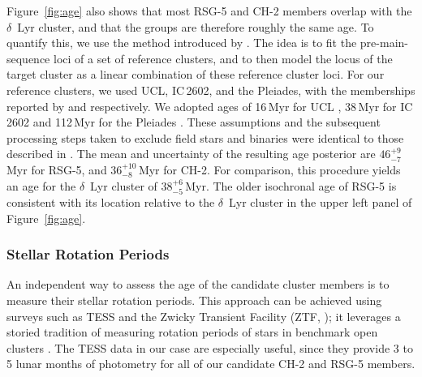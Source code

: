 \documentclass[12pt,twocolumn]{aastex63}
\begin{document}
Figure~\ref{fig:age} also shows that most RSG-5 and CH-2 members
overlap with the $\delta$~Lyr cluster, and that the groups are
therefore roughly the same age.  To quantify this, we use the method
introduced by \citet[][their Section~6.3]{gagne_mutau_2020}.  The idea
is to fit the pre-main-sequence loci of a set of reference clusters,
and to then model the locus of the target cluster as a linear
combination of these reference cluster loci.  For our reference
clusters, we used UCL, IC\,2602, and the Pleiades, with the
memberships reported by \citet{Damiani2019} and
\cite{CantatGaudin2018a} respectively.  We adopted ages of 16\,Myr for
UCL \citep{pecaut_star_2016}, 38\,Myr for IC\,2602
\citep{david_ages_2015,randich_gaiaeso_2018} and 112\,Myr for the
Pleiades \citep{dahm_2015}.  These assumptions and the subsequent
processing steps taken to exclude field stars and binaries were
identical to those described in \citet{bouma_kep1627_2022}.  The mean
and uncertainty of the resulting age posterior are $46^{+9}_{-7}$\,Myr
for RSG-5, and $36^{+10}_{-8}$\,Myr for CH-2.  For comparison, this
procedure yields an age for the $\delta$~Lyr cluster of
$38^{+6}_{-5}$\,Myr.  The older isochronal age of RSG-5 is consistent
with its location relative to the $\delta$~Lyr cluster in the upper
left panel of Figure~\ref{fig:age}.


\subsubsection{Stellar Rotation Periods}
\label{sec:rotation}

An independent way to assess the age of the candidate cluster members
is to measure their stellar rotation periods.  This approach can be
achieved using surveys such as TESS \citep{ricker_transiting_2015} and
the Zwicky Transient Facility (ZTF, \citealt{bellm_zwicky_2019}); it
leverages a storied tradition of measuring rotation periods of stars
in benchmark open clusters \citep[see
{e.g.},][]{skumanich_time_1972,curtis_rup147_2020}.  The TESS data in
our case are especially useful, since they provide 3 to 5 lunar months
of photometry for all of our candidate CH-2 and RSG-5 members.
\end{document}
